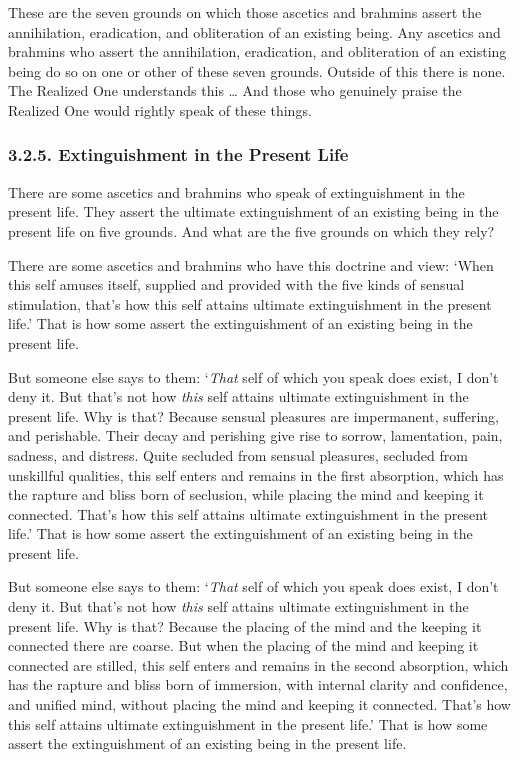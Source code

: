 \documentclass[12pt,openany]{book}%
\begin{document}
These are the seven grounds on which those ascetics and brahmins assert the annihilation, eradication, and obliteration of an existing being. Any ascetics and brahmins who assert the annihilation, eradication, and obliteration of an existing being do so on one or other of these seven grounds. Outside of this there is none. The Realized One understands this … And those who genuinely praise the Realized One would rightly speak of these things. 

\subsubsection*{3.2.5. Extinguishment in the Present Life }

There are some ascetics and brahmins who speak of extinguishment in the present life. They assert the ultimate extinguishment of an existing being in the present life on five grounds. And what are the five grounds on which they rely? 

There are some ascetics and brahmins who have this doctrine and view: ‘When this self amuses itself, supplied and provided with the five kinds of sensual stimulation, that’s how this self attains ultimate extinguishment in the present life.’ That is how some assert the extinguishment of an existing being in the present life. 

But someone else says to them: ‘\emph{That} self of which you speak does exist, I don’t deny it. But that’s not how \emph{this} self attains ultimate extinguishment in the present life. Why is that? Because sensual pleasures are impermanent, suffering, and perishable. Their decay and perishing give rise to sorrow, lamentation, pain, sadness, and distress. Quite secluded from sensual pleasures, secluded from unskillful qualities, this self enters and remains in the first absorption, which has the rapture and bliss born of seclusion, while placing the mind and keeping it connected. That’s how this self attains ultimate extinguishment in the present life.’ That is how some assert the extinguishment of an existing being in the present life. 

But someone else says to them: ‘\emph{That} self of which you speak does exist, I don’t deny it. But that’s not how \emph{this} self attains ultimate extinguishment in the present life. Why is that? Because the placing of the mind and the keeping it connected there are coarse. But when the placing of the mind and keeping it connected are stilled, this self enters and remains in the second absorption, which has the rapture and bliss born of immersion, with internal clarity and confidence, and unified mind, without placing the mind and keeping it connected. That’s how this self attains ultimate extinguishment in the present life.’ That is how some assert the extinguishment of an existing being in the present life. 
\end{document}
